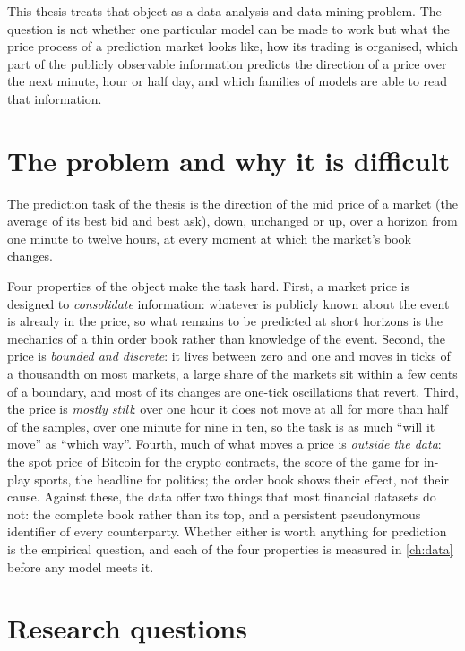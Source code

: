 This thesis treats that object as a data-analysis and data-mining problem.  The question
is not whether one particular model can be made to work but what the price process of a
prediction market looks like, how its trading is organised, which part of the publicly
observable information predicts the direction of a price over the next minute, hour or
half day, and which families of models are able to read that information.

\section{The problem and why it is difficult}
\label{sec:intro:difficulty}

The prediction task of the thesis is the direction of the mid price of a market (the
average of its best bid and best ask), down, unchanged or up, over a horizon from one minute to twelve hours, at every moment at which
the market's book changes.

Four properties of the object make the task hard.  First, a market price is designed to
\emph{consolidate} information: whatever is publicly known about the event is already in
the price, so what remains to be predicted at short horizons is the mechanics of a thin
order book rather than knowledge of the event.  Second, the price is \emph{bounded and
discrete}: it lives between zero and one and moves in ticks of a thousandth on most
markets, a large share
of the markets sit within a few cents of a boundary, and most of its changes are one-tick
oscillations that revert.  Third, the price is \emph{mostly still}: over one hour it does not
move at all for more than half of the samples, over one minute for nine in ten,
so the task is as much ``will it move'' as ``which way''.  Fourth, much of what moves a
price is \emph{outside the data}: the spot price of Bitcoin for the crypto contracts, the
score of the game for in-play sports, the headline for politics; the order book shows their
effect, not their cause.  Against these, the data offer two things that most financial
datasets do not: the complete book rather than its top, and a persistent pseudonymous
identifier of every counterparty.  Whether either is worth anything for prediction is the empirical question,
and each of the four properties is measured in \cref{ch:data} before any model meets it.

\section{Research questions}
\label{sec:intro:questions}

